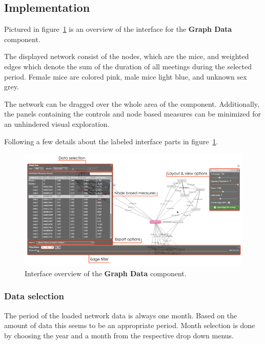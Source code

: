 \clearpage

\subsection{Implementation}
\label{subsec:graph_explore}

Pictured in figure~\ref{fig:graph_data_interface_overview} is an overview of the interface for the \textbf{Graph Data} component. 

The displayed network consist of the nodes, which are the mice, and weighted edges which denote the sum of the duration of all meetings during the selected period. Female mice are colored pink, male mice light blue, and unknown sex grey. 

The network can be dragged over the whole area of the component. Additionally, the panels containing the controls and node based measures can be minimized for an unhindered visual exploration.

Following a few details about the labeled interface parts in figure~\ref{fig:graph_data_interface_overview}.

\begin{figure}[htbp]
\begin{center}
  \includegraphics[width=\textwidth]{assets/pdf/graph_data_interface_overview.pdf}
  \caption[Graph Data interface overview]{Interface overview of the \textbf{Graph Data} component.}
  \label{fig:graph_data_interface_overview}
\end{center}
\end{figure}

\subsubsection*{Data selection}
The period of the loaded network data is always one month. Based on the amount of data this seems to be an appropriate period. Month selection is done by choosing the year and a month from the respective drop down menus.    

